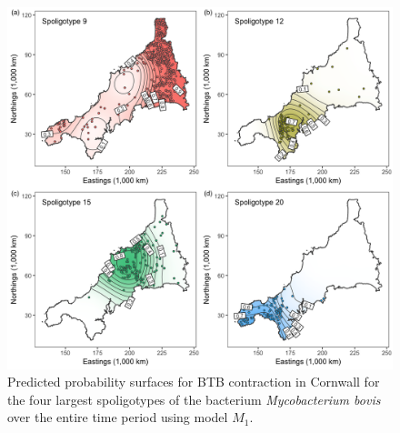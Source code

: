\documentclass[showframe,11pt]{report}\usepackage[]{graphicx}\usepackage{xcolor}
\newenvironment{knitrout}{}{} %
\begin{document}
\begin{knitrout}
\color{fgcolor}\begin{figure}[p]

{\centering \includegraphics[width=\linewidth]{figure/05-plot_btb-1} 

}

\caption[Predicted probability surfaces of BTB contraction using model $M_1$]{Predicted probability surfaces for BTB contraction in Cornwall for the four largest spoligotypes of the bacterium \emph{Mycobacterium bovis} over the entire time period using model $M_1$.}\label{fig:plot.btb}
\end{figure}


\end{knitrout}
\end{document}
